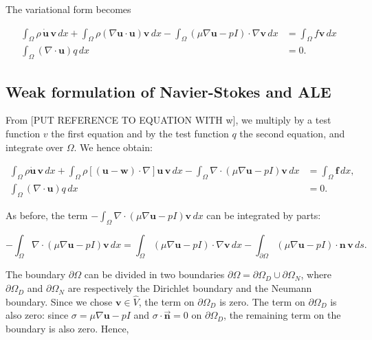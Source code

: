 \documentclass[11pt,a4paper,titlepage]{report}
\begin{document}
The variational form becomes

\begin{align}
\int_{\Omega} \rho \, \dot{\mathbf{u}} \, \mathbf{v} \, dx
+ \int_{\Omega} \rho (\nabla \mathbf{u} \cdot \mathbf{u})\mathbf{v} \, dx
- \int_{\Omega} (\mu \nabla \mathbf{u} - pI) \cdot \nabla \mathbf{v} \, dx
&= \int_{\Omega} f\mathbf{v} \, dx \\
\int_{\Omega} (\nabla \cdot \mathbf{u}) q \, dx &= 0.
\end{align}


\subsection{Weak formulation of Navier-Stokes and ALE}


From [PUT REFERENCE TO EQUATION WITH w], we multiply by a test function $v$ the first equation and by the test function $q$ the second equation, and integrate over $\Omega$. We hence obtain:

\begin{align*}
\int_{\Omega} \rho \dot{\mathbf{u}} \, \mathbf{v} \, dx
+ \int_{\Omega} \rho [(\mathbf{u - w}) \cdot \nabla] \mathbf{u} \, \mathbf{v} \, dx
- \int_{\Omega} \nabla \cdot (\mu \nabla \mathbf{u} -  pI)\mathbf{v} \, dx
&=  \int_{\Omega} \mathbf{f} \, dx, \\
 \int_{\Omega}  (\nabla \cdot \mathbf{u}) q \, dx &= 0.
\end{align*}

As before, the term $- \int_{\Omega} \nabla \cdot (\mu \nabla \mathbf{u} - pI)\mathbf{v} \, dx$ can be integrated by parts:

\[
- \int_{\Omega} \nabla \cdot (\mu \nabla \mathbf{u} - pI)\mathbf{v} \, dx
=  \int_{\Omega} (\mu \nabla \mathbf{u} - pI) \cdot \nabla \mathbf{v} \, dx
- \int_{\partial \Omega} (\mu \nabla \mathbf{u} - pI) \cdot \mathbf{n} \, \mathbf{v} \, ds.
\]

The boundary $\partial \Omega$ can be divided in two boundaries $ \partial \Omega = \partial \Omega_D \cup \partial \Omega_N $, where $\partial \Omega_D$ and $\partial \Omega_N$ are respectively the Dirichlet boundary and the Neumann boundary.
Since we chose $\mathbf{v} \in \hat{V}$, the term on $\partial \Omega_{D}$ is zero. The term on $\partial \Omega_{D}$ is also zero: since $\sigma = \mu \nabla \mathbf{u} - pI$ and $\sigma \cdot \vec{\mathbf{n}} = 0$ on $\partial \Omega_{D}$, the remaining term on the boundary is also zero. Hence,
\end{document}
